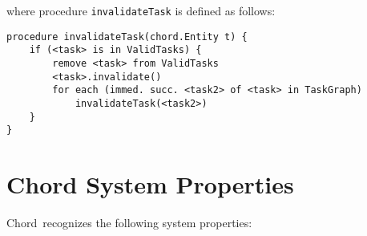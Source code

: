 \documentclass{article}
\providecommand\Chord{{Chord}}
\begin{document}
\noindent where procedure {\tt invalidateTask} is defined as follows:

{\small
\begin{verbatim}
procedure invalidateTask(chord.Entity t) {
    if (<task> is in ValidTasks) {
        remove <task> from ValidTasks
        <task>.invalidate()
        for each (immed. succ. <task2> of <task> in TaskGraph)
            invalidateTask(<task2>)
    }
}
\end{verbatim}
}

\texonly{\newpage}
\section{Chord System Properties}
\label{sec-sys-prop}

\Chord\ recognizes the following system properties:
\end{document}

